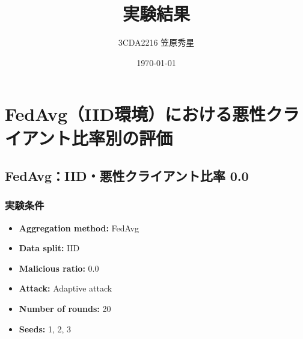 \documentclass[a4j,twocolumn,dvipdfmx]{jsarticle}
\title{\vspace{-1.5em}\textbf{実験結果}}
\author{3CDA2216 笠原秀星}
\date{\today}
\begin{document}
\maketitle

\section{FedAvg（IID環境）における悪性クライアント比率別の評価}


\subsection{FedAvg：IID・悪性クライアント比率 0.0}

\subsubsection{実験条件}

\begin{itemize}
    \item \textbf{Aggregation method:} FedAvg
    \item \textbf{Data split:} IID
    \item \textbf{Malicious ratio:} 0.0
    \item \textbf{Attack:} Adaptive attack
    \item \textbf{Number of rounds:} 20
    \item \textbf{Seeds:} 1, 2, 3
\end{itemize}

\end{document}
